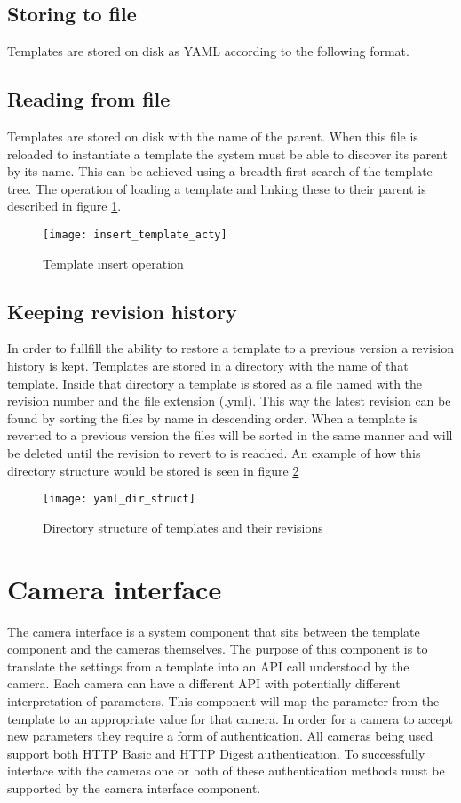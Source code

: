 \subsection{Storing to file}
Templates are stored on disk as YAML according to the following format.


\subsection{Reading from file}
Templates are stored on disk with the name of the parent. When this file is reloaded to instantiate a template the system must be able to discover its
parent by its name. This can be achieved using a breadth-first search of the template tree.
The operation of loading a template and linking these to their parent is described in figure \ref{fig:inserttemplate}.

\begin{figure}[h!]
	\centering
	\texttt{[image: insert\_template\_acty]}
	\caption{Template insert operation}
	\label{fig:inserttemplate}
\end{figure}

\subsection{Keeping revision history}
In order to fullfill the ability to restore a template to a previous version a revision history is kept.
Templates are stored in a directory with the name of that template.
Inside that directory a template is stored as a file named with the revision number and the file extension (.yml).
This way the latest revision can be found by sorting the files by name in descending order.
When a template is reverted to a previous version the files will be sorted in the same manner and will be deleted until the revision to revert to is reached. An example of how this directory structure would be stored is seen in figure \ref{fig:diskstruct}

\begin{figure}[h!]
	\centering
	\texttt{[image: yaml\_dir\_struct]}
	\caption{Directory structure of templates and their revisions}
	\label{fig:diskstruct}
\end{figure}

\section{Camera interface}
The camera interface is a system component that sits between the template component and the cameras themselves. The purpose of this component
is to translate the settings from a template into an API call understood by the camera. Each camera can have a different API with potentially different interpretation of parameters. This component will map the parameter from the template to an appropriate value for that camera.
In order for a camera to accept new parameters they require a form of authentication. All cameras being used support both HTTP Basic and HTTP Digest authentication.
To successfully interface with the cameras one or both of these authentication methods must be supported by the camera interface component.

